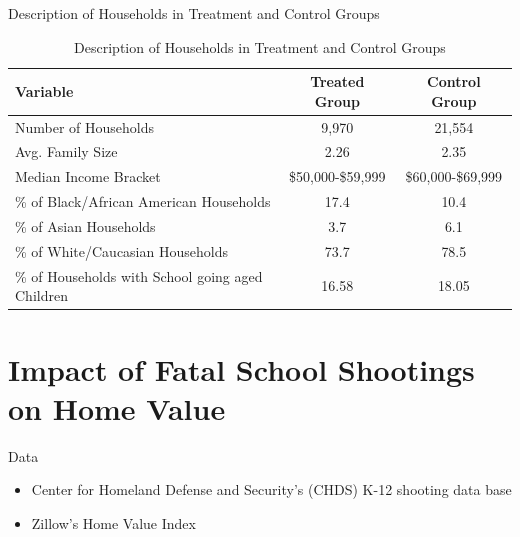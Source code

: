 \documentclass[
  ignorenonframetext,
]{beamer}
\begin{document}
\begin{frame}{Description of Households in Treatment and Control Groups}
\protect\hypertarget{description-of-households-in-treatment-and-control-groups}{}

\begin{table}[]
\centering
\caption{Description of Households in Treatment and Control Groups}
\begin{tabular}{lcc}
\midrule \midrule
Variable              & Treated Group  & Control Group   \\ \hline
Number of Households  & 9,970           & 21,554          \\
Avg. Family Size      & 2.26            & 2.35            \\
Median Income Bracket & \$50,000-\$59,999 & \$60,000-\$69,999 \\
\% of Black/African American Households             & 17.4            & 10.4            \\
\% of Asian Households              & 3.7             & 6.1             \\
\% of White/Caucasian Households          & 73.7            & 78.5            \\
\% of Households with School going aged Children           & 16.58            & 18.05            \\\midrule \midrule
\end{tabular}

\label{table:1}
\end{table}
\end{frame}

\hypertarget{impact-of-fatal-school-shootings-on-home-value}{%
\section{Impact of Fatal School Shootings on Home
Value}\label{impact-of-fatal-school-shootings-on-home-value}}

\begin{frame}{Data}
\protect\hypertarget{data-1}{}
\begin{itemize}
\item
  Center for Homeland Defense and Security's (CHDS) K-12 shooting data
  base
\item
  Zillow's Home Value Index
\end{itemize}
\end{frame}
\end{document}
